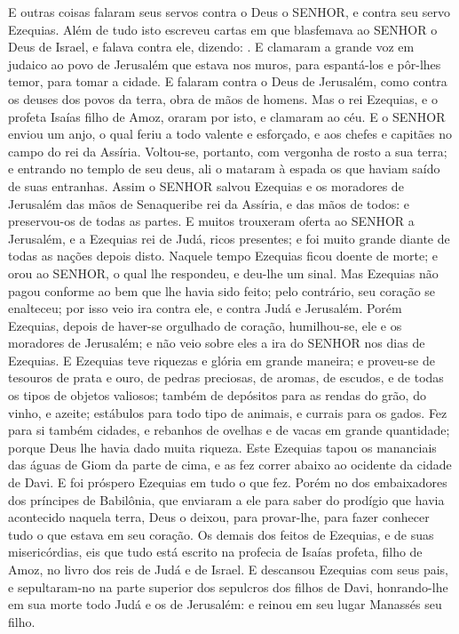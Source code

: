 {  E outras coisas falaram seus servos contra o Deus o SENHOR, e contra seu servo Ezequias.
  Além de tudo isto escreveu cartas em que blasfemava ao SENHOR o Deus de Israel, e falava contra ele, dizendo: .
  E clamaram a grande voz em judaico ao povo de Jerusalém que estava nos muros, para espantá-los e pôr-lhes temor, para tomar a cidade.
  E falaram contra o Deus de Jerusalém, como contra os deuses dos povos da terra, obra de mãos de homens.
  Mas o rei Ezequias, e o profeta Isaías filho de Amoz, oraram por isto, e clamaram ao céu.
  E o SENHOR enviou um anjo, o qual feriu a todo valente e esforçado, e aos chefes e capitães no campo do rei da Assíria. Voltou-se, portanto, com vergonha de rosto a sua terra; e entrando no templo de seu deus, ali o mataram à espada os que haviam saído de suas entranhas.
  Assim o SENHOR salvou Ezequias e os moradores de Jerusalém das mãos de Senaqueribe rei da Assíria, e das mãos de todos: e preservou-os de todas as partes.
  E muitos trouxeram oferta ao SENHOR a Jerusalém, e a Ezequias rei de Judá, ricos presentes; e foi muito grande diante de todas as nações depois disto.
  Naquele tempo Ezequias ficou doente de morte; e orou ao SENHOR, o qual lhe respondeu, e deu-lhe um sinal.
  Mas Ezequias não pagou conforme ao bem que lhe havia sido feito; pelo contrário, seu coração se enalteceu; por isso veio ira contra ele, e contra Judá e Jerusalém.
  Porém Ezequias, depois de haver-se orgulhado de coração, humilhou-se, ele e os moradores de Jerusalém; e não veio sobre eles a ira do SENHOR nos dias de Ezequias.
  E Ezequias teve riquezas e glória em grande maneira; e proveu-se de tesouros de prata e ouro, de pedras preciosas, de aromas, de escudos, e de todas os tipos de objetos valiosos;
  também de depósitos para as rendas do grão, do vinho, e azeite; estábulos para todo tipo de animais, e currais para os gados.
  Fez para si também cidades, e rebanhos de ovelhas e de vacas em grande quantidade; porque Deus lhe havia dado muita riqueza.
  Este Ezequias tapou os mananciais das águas de Giom da parte de cima, e as fez correr abaixo ao ocidente da cidade de Davi. E foi próspero Ezequias em tudo o que fez.
  Porém no dos embaixadores dos príncipes de Babilônia, que enviaram a ele para saber do prodígio que havia acontecido naquela terra, Deus o deixou, para provar-lhe, para fazer conhecer tudo o que estava em seu coração.
  Os demais dos feitos de Ezequias, e de suas misericórdias, eis que tudo está escrito na profecia de Isaías profeta, filho de Amoz, no livro dos reis de Judá e de Israel.
  E descansou Ezequias com seus pais, e sepultaram-no na parte superior dos sepulcros dos filhos de Davi, honrando-lhe em sua morte todo Judá e os de Jerusalém: e reinou em seu lugar Manassés seu filho.
\par }


